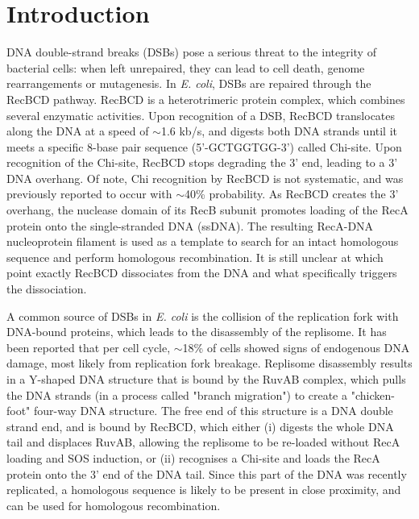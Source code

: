 \section*{Introduction}

DNA double-strand breaks (DSBs) pose a serious threat to the integrity of bacterial cells: when left unrepaired, they can lead to cell death, genome rearrangements or mutagenesis. In \emph{E. coli}, DSBs are repaired through the RecBCD pathway. RecBCD is a heterotrimeric protein complex, which combines several enzymatic activities\cite{Dillingham2008}. Upon recognition of a DSB, RecBCD translocates along the DNA at a speed of $\sim$1.6 kb/s\cite{Wiktor2018}, and digests both DNA strands until it meets a specific 8-base pair sequence (5'-GCTGGTGG-3') called Chi-site. Upon recognition of the Chi-site, RecBCD stops degrading the 3' end, leading to a 3' DNA overhang. Of note, Chi recognition by RecBCD is not systematic, and was previously reported to occur with $\sim$40\% probability\cite{Taylor1992,Cockram2015}. As RecBCD creates the 3' overhang, the nuclease domain of its RecB subunit promotes loading of the RecA protein onto the single-stranded DNA (ssDNA)\cite{Churchill2000, Spies2006}. The resulting RecA-DNA nucleoprotein filament is used as a template to search for an intact homologous sequence and perform homologous recombination. It is still unclear at which point exactly RecBCD dissociates from the DNA and what specifically triggers the dissociation.

A common source of DSBs in \emph{E. coli} is the collision of the replication fork with DNA-bound proteins, which leads to the disassembly of the replisome\cite{Michel1997}. It has been reported that per cell cycle, $\sim$18\% of cells showed signs of endogenous DNA damage, most likely from replication fork breakage\cite{Sinha2018}. Replisome disassembly results in a Y-shaped DNA structure that is bound by the RuvAB complex, which pulls the DNA strands (in a process called "branch migration") to create a "chicken-foot" four-way DNA structure\cite{Seigneur1998}. The free end of this structure is a DNA double strand end, and is bound by RecBCD, which either (i) digests the whole DNA tail and displaces RuvAB, allowing the replisome to be re-loaded without RecA loading and SOS induction\cite{Seigneur1998}, or (ii) recognises a Chi-site and loads the RecA protein onto the 3' end of the DNA tail\cite{Michel2001}. Since this part of the DNA was recently replicated, a homologous sequence is likely to be present in close proximity, and can be used for homologous recombination.


